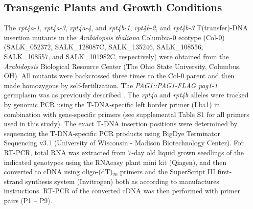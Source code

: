 \subsection{Transgenic Plants and Growth Conditions}
The \textit{rpt4a-1},\textit{ rpt4a-3},\textit{ rpt4a-4}, and \textit{rpt4b-1}, \textit{rpt4b-2}, and \textit{rpt4b-3} T(transfer)-DNA insertion mutants in the \textit{Arabidopsis thaliana} Columbia-0 ecotype (Col-0) (SALK\_052372, SALK\_128087C, SALK\_135246, SALK\_108556, SALK\_108557, and SALK\_101982C, respectively) were obtained from the \textit{Arabidopsis} Biological Resource Center (The Ohio State University, Columbus, OH). All mutants were backcrossed three times to the Col-0 parent and then made homozygous by self-fertilization. The \textit{PAG1::PAG1-FLAG pag1-1} germplasm was as previously described \citep{book10}. The \textit{rpt4a} and \textit{rpt4b} alleles were tracked by genomic PCR using the T-DNA-specific left border primer (Lba1) in combination with gene-specific primers (see supplemental Table S1 for all primers used in this study). The exact T-DNA insertion positions were determined by sequencing the T-DNA-specific PCR products using BigDye Terminator Sequencing v3.1 (University of Wisconsin - Madison Biotechnology Center). For RT-PCR, total RNA was extracted from 7-day old liquid grown seedlings of the indicated genotypes using the RNAeasy plant mini kit (Qiagen), and then converted to cDNA using oligo-(dT)$_{20}$ primers and the SuperScript III first-strand synthesis system (Invitrogen) both as according to manufactures instructions.  RT-PCR of the converted cDNA was then performed with primer pairs (P1 – P9). 

